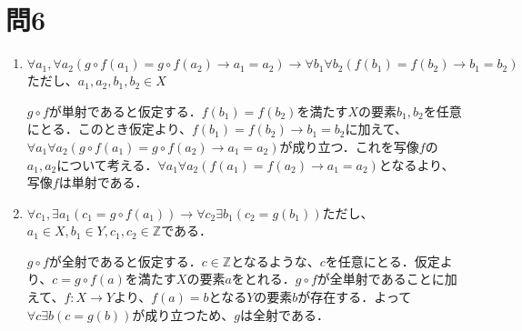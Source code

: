 \documentclass[uplatex]{jsarticle}
\begin{document}
\section{問6}
	\begin{enumerate}
		\item
			$\forall a_1 ,\forall a_2 ( g \circ f(a_1) = g \circ f(a_2) \rightarrow a_1 = a_2) \rightarrow \forall b_1 \forall b_2(f(b_1) = f(b_2) \rightarrow b_1 = b_2)$ただし、$a_1, a_2,b_1, b_2 \in X$

			$ g \circ f$が単射であると仮定する．$f(b_1) = f(b_2)$を満たす$X$の要素$b_1, b_2$を任意にとる．このとき仮定より、$f(b_1) = f(b_2) \rightarrow b_1 = b_2$に加えて、$\forall a_1 \forall a_2 (g \circ f(a_1) = g \circ f(a_2) \rightarrow a_1 = a_2)$が成り立つ．これを写像$f$の$a_1, a_2$について考える．$\forall a_1 \forall a_2 (f(a_1) = f(a_2) \rightarrow a_1 = a_2)$となるより、写像$f$は単射である．

		\item  $\forall c_1, \exists a_1(c_1 = g \circ f(a_1)) \rightarrow \forall c_2 \exists b_1 (c_2 = g(b_1))$ただし、$a_1 \in X, b_1 \in Y , c_1 , c_2 \in \mathbb{Z}$である．
				
			$ g \circ f$が全射であると仮定する．$c \in \mathbb{Z}$となるような、$c$を任意にとる．仮定より、$c = g \circ f(a)$を満たす$X$の要素$a$をとれる．$ g \circ f$が全単射であることに加えて、$f:X \rightarrow Y$より、$f(a) = b$となる$Y$の要素$b$が存在する．よって$\forall c \exists b (c = g(b))$が成り立つため、$g$は全射である．

	\end{enumerate}
\end{document}
